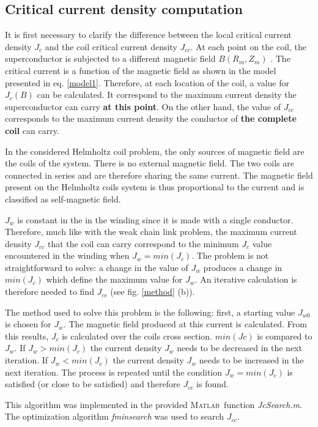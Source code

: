 \documentclass{ws-jmrr}
\newcommand{\MATLAB}{\textsc{Matlab}}
\begin{document}
\begin{multicols}{2}
\subsection{Critical current density computation}
\label{jccalc}
It is first necessary to clarify the difference between the local critical current density $J_c$ and the coil critical current density $J_{cc}$. At each point on the coil, the superconductor is subjected to a different magnetic field $B(R_m,Z_m)$ \cite{linares2016design}. The critical current is a function of the magnetic field as shown in the model presented in eq. \ref{model1}. Therefore, at each location of the coil, a value for $J_c(B)$ can be calculated. It correspond to the maximum current density the superconductor can carry \textbf{at this point}. On the other hand, the value of $J_{cc}$ corresponds to the maximum current density the conductor of \textbf{the complete coil} can carry.\par
In the considered Helmholtz coil problem, the only sources of magnetic field are the coils of the system. There is no external magnetic field. The two coils are connected in series and are therefore sharing the same current. The magnetic field present on the Helmholtz coils system is thus proportional to the current and is classified as self-magnetic field.\par
$J_w$ is constant in the in the winding since it is made with a single conductor. Therefore, much like with the weak chain link problem, the maximum current density $J_{cc}$ that the coil can carry correspond to the minimum $J_c$ value encountered in the winding when $J_w=min(J_c)$. The problem is not straightforward to solve: a change in the value of $J_w$ produces a change in $min(J_c)$ which define the maximum value for $J_w$. An iterative calculation is therefore needed to find $J_{cc}$ (see fig. \ref{method} (b)).\par
The method used to solve this problem is the following: first, a starting value $J_{w0}$ is chosen for $J_{w}$. The magnetic field produced at this current is calculated. From this results, $J_c$ is calculated over the coils cross section. $min(Jc)$ is compared to $J_w$. If $J_w>min(J_c)$ the current density $J_w$ needs to be decreased in the next iteration. If $J_w<min(J_c)$ the current density $J_w$ needs to be increased in the next iteration. The process is repeated until the condition $J_w=min(J_c)$ is satisfied (or close to be satisfied) and therefore $J_{cc}$ is found.\par
This algorithm was implemented in the provided \MATLAB ~function \emph{JcSearch.m}. The optimization algorithm \emph{fminsearch} was used to search $J_{cc}$.

\end{multicols}
\end{document}
